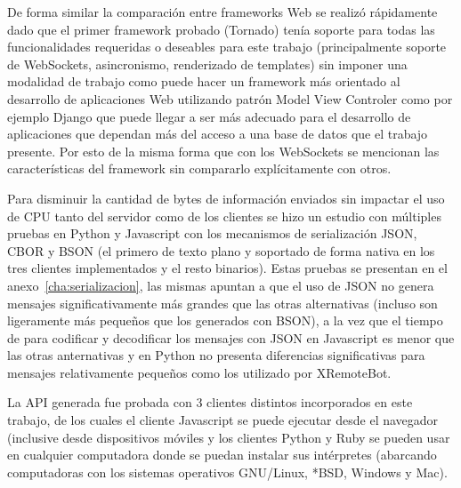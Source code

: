 De forma similar la comparación entre frameworks Web se realizó rápidamente
dado que el primer framework probado (Tornado) tenía soporte para todas
las funcionalidades requeridas o deseables para este trabajo (principalmente
soporte de WebSockets, asincronismo, renderizado de templates) sin imponer
una modalidad de trabajo como puede hacer un framework más orientado al
desarrollo de aplicaciones Web utilizando patrón Model View Controler
como por ejemplo Django que puede llegar a ser más adecuado para el desarrollo
de aplicaciones que dependan más del acceso a una base de datos que el
trabajo presente. Por esto de la misma forma que con los WebSockets se mencionan
las características del framework sin compararlo explícitamente con otros.

Para disminuir la cantidad de bytes de información enviados sin impactar el
uso de CPU tanto del servidor como de los clientes se hizo un estudio con
múltiples pruebas en Python y Javascript con los mecanismos de serialización
JSON, CBOR y BSON (el primero de texto plano y soportado de forma nativa en los
tres clientes implementados y el resto binarios). Estas pruebas se presentan
en el anexo~\ref{cha:serializacion}, las mismas apuntan a que el uso de JSON
no genera mensajes significativamente más grandes que las otras alternativas
(incluso son ligeramente más pequeños que los generados con BSON), a la vez
que el tiempo de para codificar y decodificar los mensajes con JSON en
Javascript es menor que las otras anternativas y en Python no presenta
diferencias significativas para mensajes relativamente pequeños como los utilizado
por XRemoteBot.

La API generada fue probada con 3 clientes distintos incorporados en este
trabajo, de los cuales el cliente Javascript se puede ejecutar desde el
navegador (inclusive desde dispositivos móviles y los clientes Python y
Ruby se pueden usar en cualquier computadora
donde se puedan instalar sus intérpretes (abarcando computadoras con
los sistemas operativos GNU/Linux, *BSD, Windows y Mac).


